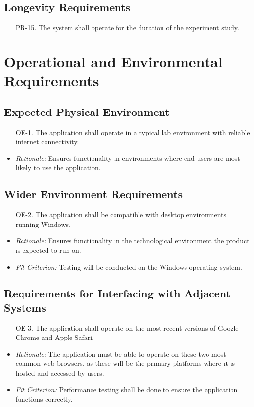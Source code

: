 \documentclass[12pt]{article}
\begin{document}
\subsection{Longevity Requirements}
\begin{enumerate}
  \item[PR-15.] The system shall operate for the duration of the experiment study.
\end{enumerate}

\section{Operational and Environmental Requirements}
\subsection{Expected Physical Environment}
\begin{enumerate}
  \item[OE-1.] The application shall operate in a typical lab environment with reliable internet connectivity.
\end{enumerate}
\begin{itemize}
  \item \textit{Rationale:} Ensures functionality in environments where end-users are most likely to use the application. 
\end{itemize}

\subsection{Wider Environment Requirements}
\begin{enumerate}
  \item[OE-2.] The application shall be compatible with desktop environments running Windows.
\end{enumerate}
\begin{itemize}
  \item \textit{Rationale:} Ensures functionality in the technological environment the product is expected to run on.
  \item \textit{Fit Criterion:} Testing will be conducted on the Windows operating system.
\end{itemize}

\subsection{Requirements for Interfacing with Adjacent Systems}
\begin{enumerate}
  \item[OE-3.] The application shall operate on the most recent versions of Google Chrome and Apple Safari.
\end{enumerate}
\begin{itemize}
  \item \textit{Rationale:} The application must be able to operate on these two
  most common web browsers, as these will be the primary platforms where it is
  hosted and accessed by users.
  \item \textit{Fit Criterion:} Performance testing shall be done to ensure the
  application functions correctly.
\end{itemize}
\end{document}
